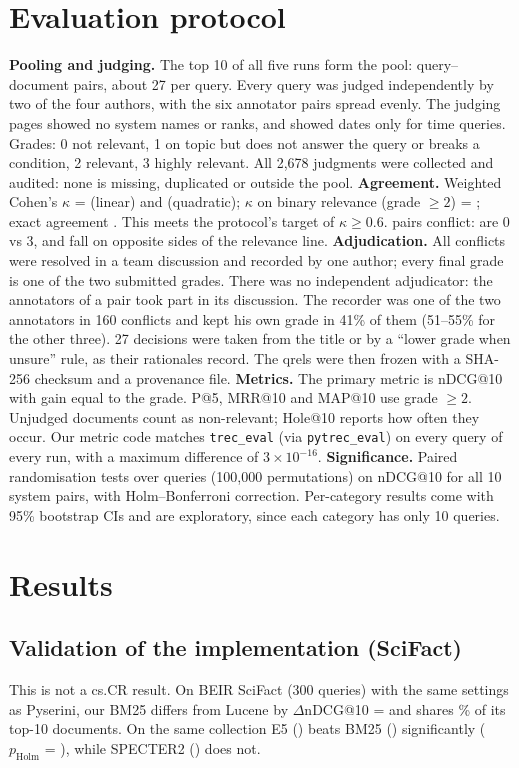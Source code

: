 \documentclass[10pt,a4paper]{article}
\begin{document}
\section{Evaluation protocol}
\textbf{Pooling and judging.} The top 10 of all five runs form the pool: \finPairs{} query--document
pairs, about 27 per query. Every query was judged independently by two of the four authors, with the
six annotator pairs spread evenly. The judging pages showed no system names or ranks, and showed dates
only for time queries. Grades: 0 not relevant, 1 on topic but does not answer the query or breaks a
condition, 2 relevant, 3 highly relevant. All 2{,}678 judgments were collected and audited: none is
missing, duplicated or outside the pool.
\textbf{Agreement.} Weighted Cohen's $\kappa$ = \finKappaLin{} (linear) and \finKappaQuad{}
(quadratic); $\kappa$ on binary relevance (grade $\geq 2$) = \finKappaBin{}; exact agreement
\finExact{}. This meets the protocol's target of $\kappa\geq 0.6$. \finConflicts{} pairs conflict:
\finZeroThree{} are 0 vs 3, and \finCross{} fall on opposite sides of the relevance line.
\textbf{Adjudication.} All conflicts were resolved in a team discussion and recorded by one author;
every final grade is one of the two submitted grades. There was no independent adjudicator: the
annotators of a pair took part in its discussion. The recorder was one of the two annotators in 160
conflicts and kept his own grade in 41\% of them (51--55\% for the other three). 27 decisions were
taken from the title or by a ``lower grade when unsure'' rule, as their rationales record. The qrels were
then frozen with a SHA-256 checksum and a provenance file.
\textbf{Metrics.} The primary metric is nDCG@10 with gain equal to the grade. P@5, MRR@10 and MAP@10
use grade $\geq 2$. Unjudged documents count as non-relevant; Hole@10 reports how often they occur.
Our metric code matches \texttt{trec\_eval} (via \texttt{pytrec\_eval}) on every query of every run,
with a maximum difference of $3\times10^{-16}$.
\textbf{Significance.} Paired randomisation tests over queries (100{,}000 permutations) on nDCG@10 for
all 10 system pairs, with Holm--Bonferroni correction. Per-category results come with 95\% bootstrap
CIs and are exploratory, since each category has only 10 queries.

\section{Results}
\subsection{Validation of the implementation (SciFact)}\label{sec:sci}
This is not a cs.CR result. On BEIR SciFact (300 queries) with the same settings as Pyserini, our BM25
differs from Lucene by $\Delta$nDCG@10 = \sciDiff{} and shares \sciOverlap\% of its top-10 documents.
On the same collection E5 (\sciEfive) beats BM25 (\sciBM) significantly ($p_{\text{Holm}}$ =
\sciPBmtwofiveEfive), while SPECTER2 (\sciSpec) does not.
\end{document}
